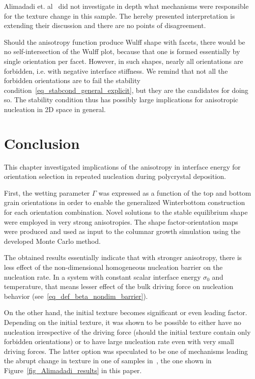 Alimadadi et. al~\cite{Alimadadi2016} did not investigate in depth what mechanisms were responsible for the texture change in this sample. The hereby presented interpretation is extending their discussion and there are no points of disagreement.

Should the anisotropy function produce Wulff shape with facets, there would be no self-intersection of the Wulff plot, because that one is formed essentially by single orientation per facet. However, in such shapes, nearly all orientations are forbidden, i.e. with negative interface stiffness. We remind that not all the forbidden orientations are to fail the stability condition~\eqref{eq_stabcond_general_explicit}, but they are the candidates for doing so. The stability condition thus has possibly large implications for anisotropic nucleation in 2D space in general.  

\section{Conclusion}
This chapter investigated implications of the anisotropy in interface energy for orientation selection in repeated nucleation during polycrystal deposition. 

First, the wetting parameter $\Gamma$ was expressed as a function of the top and bottom grain orientations in order to enable the generalized Winterbottom construction for each orientation combination. Novel solutions to the stable equilibrium shape were employed in very strong anisotropies. The shape factor-orientation maps were produced and used as input to the columnar growth simulation using the developed Monte Carlo method.

The obtained results essentially indicate that with stronger anisotropy, there is less effect of the non-dimensional homogeneous nucleation barrier on the nucleation rate. In a system with constant scalar interface energy $\sigma_0$ and temperature, that means lesser effect of the bulk driving force on nucleation behavior (see~\eqref{eq_def_beta_nondim_barrier}). 

On the other hand, the initial texture becomes significant or even leading factor. Depending on the initial texture, it was shown to be possible to either have no nucleation irrespective of the driving force (should the initial texture contain only forbidden orientations) or to have large nucleation rate even with very small driving forces. The latter option was speculated to be one of mechanisms leading the abrupt change in texture in one of samples in~\cite{Alimadadi2016}, the one shown in Figure~\ref{fig_Alimadadi_results} in this paper.

